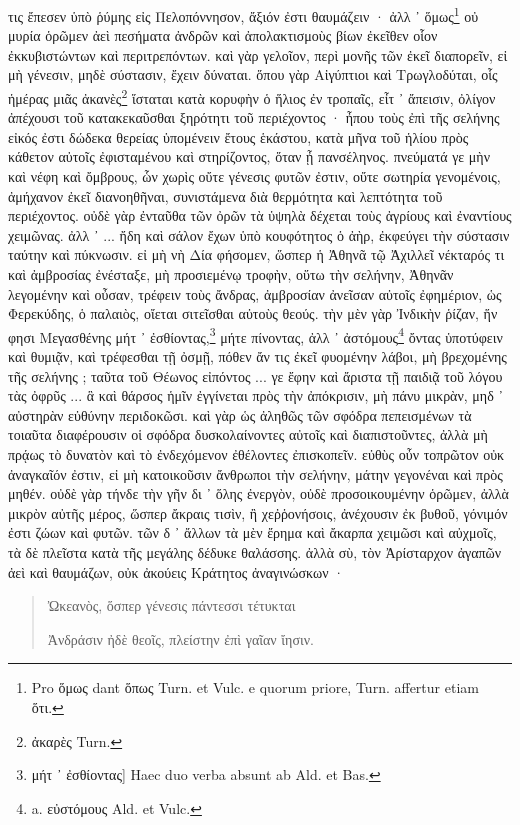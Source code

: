 \documentclass[a4paper, 11pt, oneside, polutonikogreek, german]{article}
\begin{document}
τις ἔπεσεν ὑπὸ ῥύμης εἰς Πελοπόννησον, ἄξιόν ἐστι θαυμάζειν · ἀλλ ᾽ ὅμως\footnote{Pro ὅμως dant ὅπως Turn. et Vulc. e quorum priore, Turn. affertur etiam ὅτι.} οὐ μυρία ὁρῶμεν ἀεὶ πεσήματα ἀνδρῶν καὶ ἀπολακτισμοὺς βίων ἐκεῖθεν οἷον ἐκκυβιστώντων καὶ περιτρεπόντων. καὶ γὰρ γελοῖον, περὶ μονῆς τῶν ἐκεῖ διαπορεῖν, εἰ μὴ γένεσιν, μηδὲ σύστασιν, ἔχειν δύναται. ὅπου γὰρ Αἰγύπτιοι καὶ Τρωγλοδύται, οἷς ἡμέρας μιᾶς ἀκανὲς\footnote{ἀκαρὲς Turn.} ἵσταται κατὰ κορυφὴν ὁ ἥλιος ἐν τροπαῖς, εἶτ ᾽ ἄπεισιν, ὀλίγον ἀπέχουσι τοῦ κατακεκαῦσθαι ξηρότητι τοῦ περιέχοντος · ἦπου τοὺς ἐπὶ τῆς σελήνης εἰκός ἐστι δώδεκα θερείας ὑπομένειν ἔτους ἑκάστου, κατὰ μῆνα τοῦ ἡλίου πρὸς κάθετον αὐτοῖς ἐφισταμένου καὶ στηρίζοντος, ὅταν ᾖ πανσέληνος. πνεύματά γε μὴν καὶ νέφη καὶ ὄμβρους, ὧν χωρὶς οὔτε γένεσις φυτῶν ἐστιν, οὔτε σωτηρία γενομένοις, ἀμήχανον ἐκεῖ διανοηθῆναι, συνιστάμενα διὰ θερμότητα καὶ λεπτότητα τοῦ περιέχοντος. οὐδὲ γὰρ ἐνταῦθα τῶν ὀρῶν τὰ ὑψηλὰ δέχεται τοὺς ἀγρίους καὶ ἐναντίους χειμῶνας. ἀλλ ᾽ ... ἤδη καὶ σάλον ἔχων ὑπὸ κουφότητος ὁ ἀὴρ, ἐκφεύγει τὴν σύστασιν ταύτην καὶ πύκνωσιν. εἰ μὴ νὴ Δία φήσομεν, ὥσπερ ἡ Ἀθηνᾶ τῷ Ἀχιλλεῖ νέκταρός τι καὶ ἀμβροσίας ἐνέσταξε, μὴ προσιεμένῳ τροφὴν, οὕτω τὴν σελήνην, Ἀθηνᾶν λεγομένην καὶ οὖσαν, τρέφειν τοὺς ἄνδρας, ἀμβροσίαν ἀνεῖσαν αὐτοῖς ἐφημέριον, ὡς Φερεκύδης, ὁ παλαιὸς, οἴεται σιτεῖσθαι αὐτοὺς θεούς. τὴν μὲν γὰρ Ἰνδικὴν ῥίζαν, ἥν φησι Μεγασθένης μήτ ᾽ ἐσθίοντας,\footnote{μήτ ᾽ ἐσθίοντας] Haec duo verba absunt ab Ald. et Bas.} μήτε πίνοντας, ἀλλ ᾽ ἀστόμους\footnote{a. εὐστόμους Ald. et Vulc.} ὄντας ὑποτύφειν καὶ θυμιᾷν, καὶ τρέφεσθαι τῇ ὀσμῇ, πόθεν ἄν τις ἐκεῖ φυομένην λάβοι, μὴ βρεχομένης τῆς σελήνης ; ταῦτα τοῦ Θέωνος εἰπόντος ... γε ἔφην καὶ ἄριστα τῇ παιδιᾷ τοῦ λόγου τὰς ὀφρῦς ... ἃ καὶ θάρσος ἡμῖν ἐγγίνεται πρὸς τὴν ἀπόκρισιν, μὴ πάνυ μικρὰν, μηδ ᾽ αὐστηρὰν εὐθύνην περιδοκῶσι. καὶ γὰρ ὡς ἀληθῶς τῶν σφόδρα πεπεισμένων τὰ τοιαῦτα διαφέρουσιν οἱ σφόδρα δυσκολαίνοντες αὐτοῖς καὶ διαπιστοῦντες, ἀλλὰ μὴ πρᾴως τὸ δυνατὸν καὶ τὸ ἐνδεχόμενον ἐθέλοντες ἐπισκοπεῖν. εὐθὺς οὖν τοπρῶτον οὐκ ἀναγκαῖόν ἐστιν, εἰ μὴ κατοικοῦσιν ἄνθρωποι τὴν σελήνην, μάτην γεγονέναι καὶ πρὸς μηθέν. οὐδὲ γὰρ τήνδε τὴν γῆν δι ᾽ ὅλης ἐνεργὸν, οὐδὲ προσοικουμένην ὁρῶμεν, ἀλλὰ μικρὸν αὐτῆς μέρος, ὥσπερ ἄκραις τισὶν, ἢ χεῤῥονήσοις, ἀνέχουσιν ἐκ βυθοῦ, γόνιμόν ἐστι ζώων καὶ φυτῶν. τῶν δ ᾽ ἄλλων τὰ μὲν ἔρημα καὶ ἄκαρπα χειμῶσι καὶ αὐχμοῖς, τὰ δὲ πλεῖστα κατὰ τῆς μεγάλης δέδυκε θαλάσσης. ἀλλὰ σὺ, τὸν Ἀρίσταρχον ἀγαπῶν ἀεὶ καὶ θαυμάζων, οὐκ ἀκούεις Κράτητος ἀναγινώσκων ·
\begin{quotation}
Ὠκεανὸς, ὅσπερ γένεσις πάντεσσι τέτυκται

Ἀνδράσιν ἠδὲ θεοῖς, πλείστην ἐπὶ γαῖαν ἴησιν.
\end{quotation}
\end{document}
